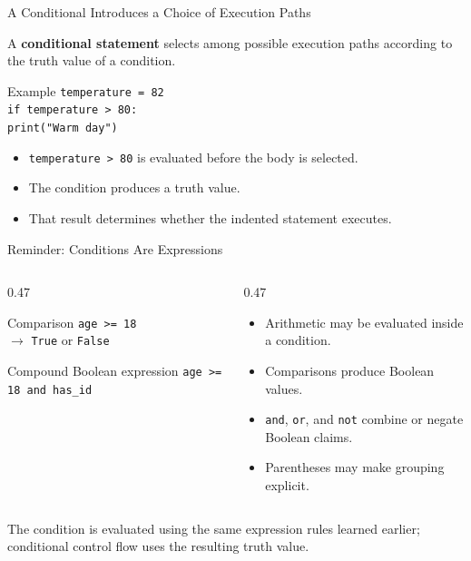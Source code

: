 \documentclass[aspectratio=169,10pt]{beamer}
\begin{document}
\begin{frame}{A Conditional Introduces a Choice of Execution Paths}
  \begin{cpdefinition}
    A \textbf{conditional statement} selects among possible execution paths according to the truth value of a condition.
  \end{cpdefinition}

  \begin{block}{Example}
    \texttt{temperature = 82}\\[0.06in]
    \texttt{if temperature > 80:}\\
    \hspace*{0.20in}\texttt{print("Warm day")}
  \end{block}

  \begin{itemize}
    \item \texttt{temperature > 80} is evaluated before the body is selected.
    \item The condition produces a truth value.
    \item That result determines whether the indented statement executes.
  \end{itemize}
\end{frame}

\begin{frame}{Reminder: Conditions Are Expressions}
  \begin{columns}[T,onlytextwidth]
    \begin{column}{0.47\textwidth}
      \begin{block}{Comparison}
        \texttt{age >= 18}\\[0.08in]
        $\longrightarrow$ \texttt{True} or \texttt{False}
      \end{block}

      \begin{block}{Compound Boolean expression}
        \texttt{age >= 18 and has\_id}
      \end{block}
    \end{column}

    \begin{column}{0.47\textwidth}
      \begin{itemize}
        \item Arithmetic may be evaluated inside a condition.
        \item Comparisons produce Boolean values.
        \item \texttt{and}, \texttt{or}, and \texttt{not} combine or negate Boolean claims.
        \item Parentheses may make grouping explicit.
      \end{itemize}
    \end{column}
  \end{columns}

  \begin{keyidea}
    The condition is evaluated using the same expression rules learned earlier; conditional control flow uses the resulting truth value.
  \end{keyidea}
\end{frame}
\end{document}

